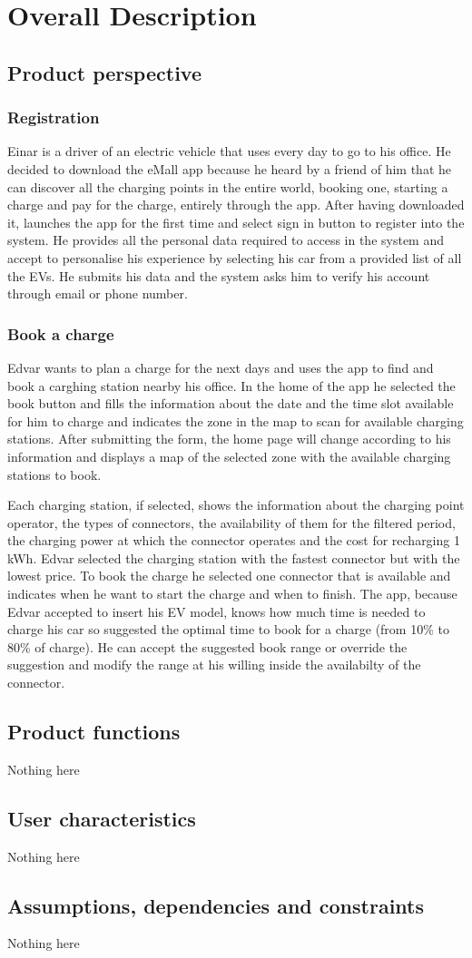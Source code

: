 \section{Overall Description}

\subsection{Product perspective}

\subsubsection{Registration}
Einar is a driver of an electric vehicle that uses every day to go to his office. He decided to download the eMall app because he heard by a friend of him that he can discover all the charging points in the entire world, booking one, starting a charge and pay for the charge, entirely through the app. After having downloaded it, launches the app for the first time and select sign in button to register into the system. He provides all the personal data required to access in the system and accept to personalise his experience by selecting his car from a provided list of all the EVs. He submits his data and the system asks him to verify his account through email or phone number.
\subsubsection{Book a charge}
Edvar wants to plan a charge for the next days and uses the app to find and book a carghing station nearby his office. In the home of the app he selected the book button and fills the information about the date and the time slot available for him to charge and indicates the zone in the map to scan for available charging stations. After submitting the form, the home page will change according to his information and displays a map of the selected zone with the available charging stations to book. 

Each charging station, if selected, shows the information about the charging point operator, the types of connectors, the availability of them for the filtered period, the charging power at which the connector operates and the cost for recharging 1 kWh. Edvar selected the charging station with the fastest connector but with the lowest price. To book the charge he selected one connector that is available and indicates when he want to start the charge and when to finish. The app, because Edvar accepted to insert his EV model, knows how much time is needed to charge his car so suggested the optimal time to book for a charge (from 10\% to 80\% of charge). He can accept the suggested book range or override the suggestion and modify the range at his willing inside the availabilty of the connector. 


\subsection{Product functions}
Nothing here

\subsection{User characteristics}
Nothing here

\subsection{Assumptions, dependencies and constraints}
Nothing here
